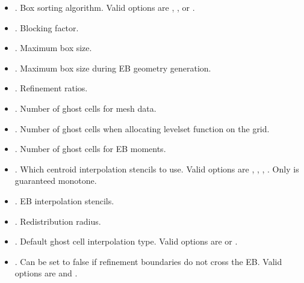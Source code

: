 \documentclass[letterpaper,10pt,english]{sphinxmanual}
\begin{document}
\begin{itemize}
\item {} 
\sphinxAtStartPar
{}. Box sorting algorithm. Valid options are , , or .

\item {} 
\sphinxAtStartPar
{}. Blocking factor.

\item {} 
\sphinxAtStartPar
{}. Maximum box size.

\item {} 
\sphinxAtStartPar
{}. Maximum box size during EB geometry generation.

\item {} 
\sphinxAtStartPar
{}. Refinement ratios.

\item {} 
\sphinxAtStartPar
{}. Number of ghost cells for mesh data.

\item {} 
\sphinxAtStartPar
{}. Number of ghost cells when allocating level\sphinxhyphen{}set function on the grid.

\item {} 
\sphinxAtStartPar
{}. Number of ghost cells for EB moments.

\item {} 
\sphinxAtStartPar
{}. Which centroid interpolation stencils to use. Valid options are , , , . Only  is guaranteed monotone.

\item {} 
\sphinxAtStartPar
{}. EB interpolation stencils.

\item {} 
\sphinxAtStartPar
{}. Redistribution radius.

\item {} 
\sphinxAtStartPar
{}. Default ghost cell interpolation type. Valid options are  or .

\item {} 
\sphinxAtStartPar
{}. Can be set to false if refinement boundaries do not cross the EB. Valid options are  and .

\end{itemize}
\end{document}
